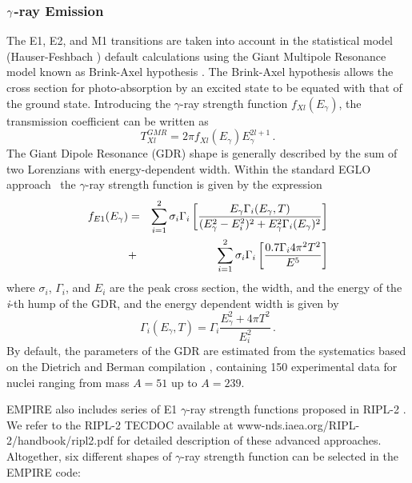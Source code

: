 \subsubsection{$\protect\gamma$-ray Emission}

The E1, E2, and M1 transitions are taken into account in the statistical
model (Hauser-Feshbach%
) default calculations using the Giant Multipole
Resonance model known as Brink-Axel hypothesis \cite{Axel,Brink,Brinka}. The
Brink-Axel hypothesis allows the cross section for photo-absorption by an
excited state to be equated with that of the ground state. Introducing the $%
\gamma$-ray strength function $f_{Xl}(E_{\gamma})$, the transmission
coefficient can be written as
\begin{equation}
T_{Xl}^{GMR}=2\pi f_{Xl}(E_{\gamma})E_{\gamma}^{2l+1}\,.  \label{tgGMR}
\end{equation}
The Giant Dipole Resonance (GDR) shape is generally described by the sum of
two Lorenzians with energy-dependent width. Within the standard EGLO
approach~\cite{kop01} the $\gamma$-ray strength function is given by the
expression \noindent
\begin{eqnarray}
f_{E1}(E_{\gamma})&=&\sum_{i=1}^{2}\sigma_{i}\Gamma_{i}\left[%
\frac{E_{\gamma}\Gamma_{i}(E_{\gamma},T)}{(E_{\gamma}^{2}-E_{i}^{2})^{2}+E_{%
\gamma}^{2}\Gamma_{i}(E_{\gamma})^{2}}\right]  \notag \\
&+&\sum_{i=1}^{2}\sigma_{i}\Gamma_{i}\left[\frac{0.7\Gamma_{i}4\pi^{2}T^{2}}{%
E^{5}}\right]  \label{lorenz}
\end{eqnarray}
\noindent where $\sigma_{i}$, $\Gamma_{i}$, and $E_{i}$ are the peak cross
section, the width, and the energy of the \emph{i}-th hump of the GDR, and
the energy dependent width is given by
\begin{equation}
\Gamma_{i}(E_{\gamma},T)=\Gamma_{i}\frac{E_{\gamma}^{2}+4\pi T^{2}}{E_{i}^{2}%
}\,.
\end{equation}
By default, the parameters of the GDR are estimated from the systematics
based on the Dietrich and Berman compilation \cite{die88}, containing 150
experimental data for nuclei ranging from mass $A=51$ up to $A=239$.

EMPIRE also includes series of E1 $\gamma$-ray strength functions proposed
in RIPL-2 \cite{RIPL2}. We refer to the RIPL-2 TECDOC available at
www-nds.iaea.org/RIPL-2/handbook/ripl2.pdf for detailed description of these
advanced approaches. Altogether, six different shapes of $\gamma$-ray
strength function can be selected in the EMPIRE code:


